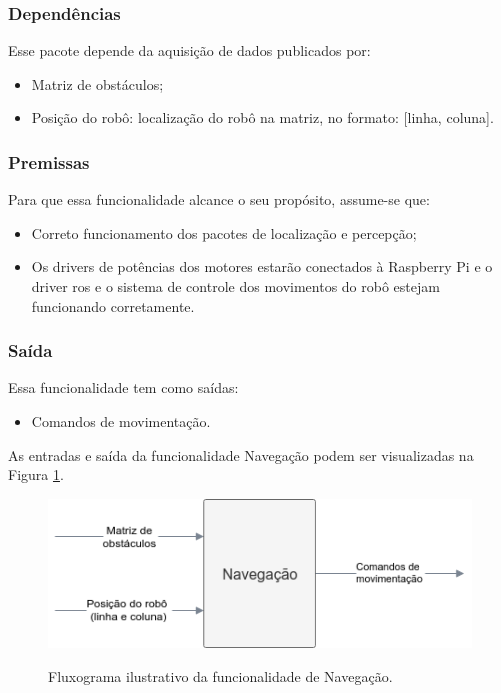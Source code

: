 \subsubsection{Dependências}
Esse pacote depende da aquisição de dados publicados por:
\begin{itemize}
	\item Matriz de obstáculos;
	\item Posição do robô: localização do robô na matriz, no formato: [linha, coluna].
\end{itemize}

\subsubsection{Premissas}
Para que essa funcionalidade alcance o seu propósito, assume-se que:
\begin{itemize}
	\item Correto funcionamento dos pacotes de localização e percepção;
	\item Os drivers de potências dos motores estarão conectados à Raspberry Pi e o driver \gls*{ros} e o sistema de controle dos movimentos do robô estejam funcionando corretamente.
\end{itemize}

\subsubsection{Saída}
Essa funcionalidade tem como saídas:
\begin{itemize}
	\item Comandos de movimentação.
\end{itemize}

As entradas e saída da funcionalidade Navegação podem ser visualizadas na Figura \ref{fig:especificacao_funcional_navegacao}.

\begin{figure}[H]
	\centering
	\caption{Fluxograma ilustrativo da funcionalidade de Navegação.}
	\includegraphics[width=1\textwidth]
	{Figures/especificacao_funcional_navegacao}
	\label{fig:especificacao_funcional_navegacao}
\end{figure}

